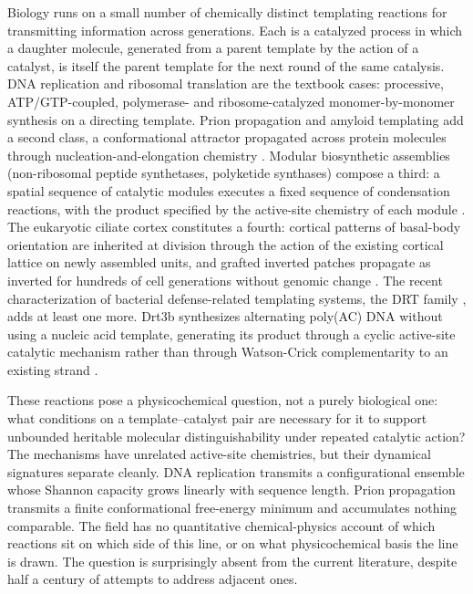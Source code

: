 \documentclass[aps,prx,reprint,amsmath,amssymb,floatfix,superscriptaddress,nofootinbib]{revtex4-2}
\theoremstyle{plain-thm}
\theoremstyle{definition-thm}
\begin{document}
Biology runs on a small number of chemically distinct templating reactions for transmitting information across generations. Each is a catalyzed process in which a daughter molecule, generated from a parent template by the action of a catalyst, is itself the parent template for the next round of the same catalysis. DNA replication and ribosomal translation are the textbook cases: processive, ATP/GTP-coupled, polymerase- and ribosome-catalyzed monomer-by-monomer synthesis on a directing template. Prion propagation and amyloid templating add a second class, a conformational attractor propagated across protein molecules through nucleation-and-elongation chemistry \citep{Greenwald2016}. Modular biosynthetic assemblies (non-ribosomal peptide synthetases, polyketide synthases) compose a third: a spatial sequence of catalytic modules executes a fixed sequence of condensation reactions, with the product specified by the active-site chemistry of each module \citep{Walsh2001}. The eukaryotic ciliate cortex constitutes a fourth: cortical patterns of basal-body orientation are inherited at division through the action of the existing cortical lattice on newly assembled units, and grafted inverted patches propagate as inverted for hundreds of cell generations without genomic change \citep{BeissonSonneborn1965, Frankel1989}. The recent characterization of bacterial defense-related templating systems, the DRT family \citep{Deng2026, DRT1preprint2026, DRT7preprint2026}, adds at least one more. Drt3b synthesizes alternating poly(AC) DNA without using a nucleic acid template, generating its product through a cyclic active-site catalytic mechanism rather than through Watson-Crick complementarity to an existing strand \citep{Deng2026}.

These reactions pose a physicochemical question, not a purely biological one: what conditions on a template--catalyst pair are necessary for it to support unbounded heritable molecular distinguishability under repeated catalytic action? The mechanisms have unrelated active-site chemistries, but their dynamical signatures separate cleanly. DNA replication transmits a configurational ensemble whose Shannon capacity grows linearly with sequence length. Prion propagation transmits a finite conformational free-energy minimum and accumulates nothing comparable. The field has no quantitative chemical-physics account of which reactions sit on which side of this line, or on what physicochemical basis the line is drawn. The question is surprisingly absent from the current literature, despite half a century of attempts to address adjacent ones.
\end{document}
